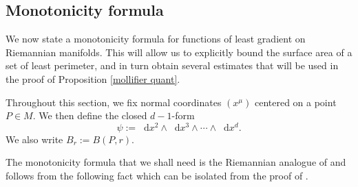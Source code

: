 \documentclass[reqno,12pt,letterpaper]{amsart}
\newcommand*\dif{\mathop{}\!\mathrm{d}}
\theoremstyle{definition}
\numberwithin{equation}{section}
\begin{document}
\subsection{Monotonicity formula}
We now state a monotonicity formula for functions of least gradient on Riemannian manifolds.
This will allow us to explicitly bound the surface area of a set of least perimeter, and in turn obtain several estimates that will be used in the proof of Proposition \ref{mollifier quant}.

Throughout this section, we fix normal coordinates $(x^\mu)$ centered on a point $P \in M$.
We then define the closed $d-1$-form
\begin{equation}\label{d1 form}
\psi := \dif x^2 \wedge \dif x^3 \wedge \cdots \wedge \dif x^d.
\end{equation}
We also write $B_r := B(P, r)$.

The monotonicity formula that we shall need is the Riemannian analogue of \cite[Proposition 5.12]{Giusti77} and follows from the following fact which can be isolated from the proof of \cite[Lemma 5.8]{Giusti77}.
\end{document}
